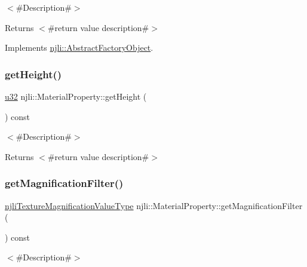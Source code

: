 $<$\#\+Description\#$>$

\begin{DoxyReturn}{Returns}
$<$\#return value description\#$>$ 
\end{DoxyReturn}


Implements \mbox{\hyperlink{classnjli_1_1_abstract_factory_object_af4151e41b80d5bc3fc42822c67fc2278}{njli\+::\+Abstract\+Factory\+Object}}.

\mbox{\label{classnjli_1_1_material_property_a15f1ba5be6e2f5da618dea70c3e2700e}} 
\subsubsection{\texorpdfstring{get\+Height()}{getHeight()}}
{\footnotesize\ttfamily \mbox{\hyperlink{_util_8h_a10e94b422ef0c20dcdec20d31a1f5049}{u32}} njli\+::\+Material\+Property\+::get\+Height (\begin{DoxyParamCaption}{ }\end{DoxyParamCaption}) const}

$<$\#\+Description\#$>$

\begin{DoxyReturn}{Returns}
$<$\#return value description\#$>$ 
\end{DoxyReturn}
\mbox{\label{classnjli_1_1_material_property_aa5f65e3731941c88cc6600b414a8b1dd}} 
\subsubsection{\texorpdfstring{get\+Magnification\+Filter()}{getMagnificationFilter()}}
{\footnotesize\ttfamily \mbox{\hyperlink{namespacenjli_a9fe7a080d946c5be3afc71d834dc7902}{njli\+Texture\+Magnification\+Value\+Type}} njli\+::\+Material\+Property\+::get\+Magnification\+Filter (\begin{DoxyParamCaption}{ }\end{DoxyParamCaption}) const}

$<$\#\+Description\#$>$

